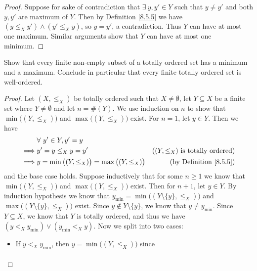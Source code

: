 \begin{proof}
    Suppose for sake of contradiction that \(\exists\ y, y' \in Y\) such that \(y \neq y'\) and both \(y, y'\) are maximum of \(Y\).
    Then by Definition \ref{8.5.5} we have \((y \leq_X y') \land (y' \leq_X y)\), so \(y = y'\), a contradiction.
    Thus \(Y\) can have at most one maximum.
    Similar arguments show that \(Y\) can have at most one minimum.
\end{proof}

\begin{exercise}\label{ex 8.5.8}
    Show that every finite non-empty subset of a totally ordered set has a minimum and a maximum.
    Conclude in particular that every finite totally ordered set is well-ordered.
\end{exercise}

\begin{proof}
    Let \((X, \leq_X)\) be totally ordered such that \(X \neq \emptyset\), let \(Y \subseteq X\) be a finite set where \(Y \neq \emptyset\) and let \(n = \#(Y)\).
    We use induction on \(n\) to show that \(\min\big((Y, \leq_X)\big)\) and \(\max\big((Y, \leq_X)\big)\) exist.
    For \(n = 1\), let \(y \in Y\).
    Then we have
    \begin{align*}
                 & \forall\ y' \in Y, y' = y                                                                               \\
        \implies & y' = y \leq_X y = y'                                      & \text{(\((Y, \leq_X)\) is totally ordered)} \\
        \implies & y = \min\big((Y, \leq_X)\big) = \max\big((Y, \leq_X)\big) & \text{(by Definition \ref{8.5.5})}
    \end{align*}
    and the base case holds.
    Suppose inductively that for some \(n \geq 1\) we know that \(\min\big((Y, \leq_X)\big)\) and \(\max\big((Y, \leq_X)\big)\) exist.
    Then for \(n + 1\), let \(y \in Y\).
    By induction hypothesis we know that \(y_{\min} = \min\big((Y \setminus \{y\}, \leq_X)\big)\) and \(\max\big((Y \setminus \{y\}, \leq_X)\big)\) exist.
    Since \(y \notin Y \setminus \{y\}\), we know that \(y \neq y_{\min}\).
    Since \(Y \subseteq X\), we know that \(Y\) is totally ordered, and thus we have \((y <_X y_{\min}) \lor (y_{\min} <_X y)\).
    Now we split into two cases:
    \begin{itemize}
        \item If \(y <_X y_{\min}\), then \(y = \min\big((Y, \leq_X)\big)\) since
              \begin{align*}

\end{align*}
\end{itemize}
\end{proof}
